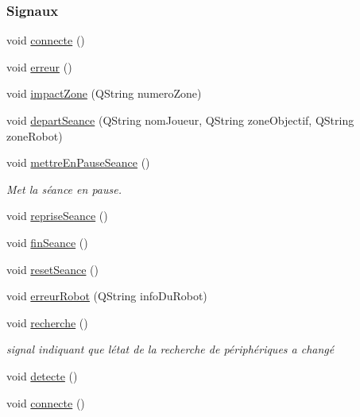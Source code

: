\subsubsection*{Signaux}
\begin{DoxyCompactItemize}
\item 
void \hyperlink{class_communication_bluetooth_a76f44488775d68071d43b418a7a1c75e}{connecte} ()
\item 
void \hyperlink{class_communication_bluetooth_a90c5c3c42145bad0f80a7a75d98dc253}{erreur} ()
\item 
void \hyperlink{class_communication_bluetooth_a71bd8acb7452d3e27884ce696f7a73d9}{impact\+Zone} (Q\+String numero\+Zone)
\item 
void \hyperlink{class_communication_bluetooth_ab11003b21b249385e466ac80b3a0b780}{depart\+Seance} (Q\+String nom\+Joueur, Q\+String zone\+Objectif, Q\+String zone\+Robot)
\item 
void \hyperlink{class_communication_bluetooth_a8572b6316814e3d226ce7acc754f0c4d}{mettre\+En\+Pause\+Seance} ()
\begin{DoxyCompactList}\small\item\em Met la séance en pause. \end{DoxyCompactList}\item 
void \hyperlink{class_communication_bluetooth_a332792330a61464c655c99e6379238c1}{reprise\+Seance} ()
\item 
void \hyperlink{class_communication_bluetooth_ac8984ecbcf5b35ae72f3d0668a0cbbcb}{fin\+Seance} ()
\item 
void \hyperlink{class_communication_bluetooth_a1121bca5300f5bb1df09eb0378feeb0b}{reset\+Seance} ()
\item 
void \hyperlink{class_communication_bluetooth_a9de64febd3f18753c559cc2e55df3cb1}{erreur\+Robot} (Q\+String info\+Du\+Robot)
\item 
void \hyperlink{class_communication_bluetooth_a51ea5f21cc952cabc02c0a0f364b69d9}{recherche} ()
\begin{DoxyCompactList}\small\item\em signal indiquant que l\textquotesingle{}état de la recherche de périphériques a changé \end{DoxyCompactList}\item 
void \hyperlink{class_communication_bluetooth_a27ecb0427e1d2a6c936294e8a68e511f}{detecte} ()
\item 
void \hyperlink{class_communication_bluetooth_a76f44488775d68071d43b418a7a1c75e}{connecte} ()
\item 

\end{DoxyCompactItemize}
